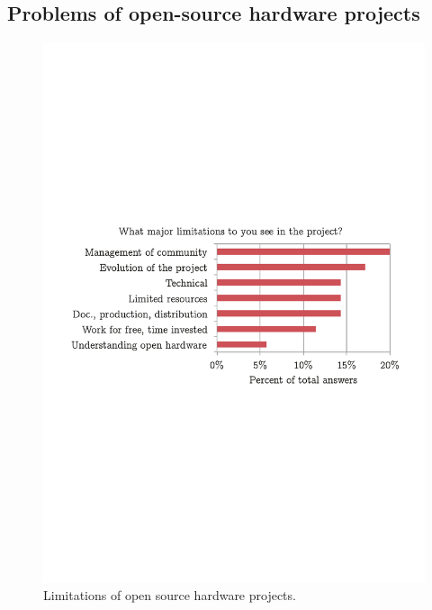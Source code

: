 \documentclass[letterpaper, 10 pt, conference]{ieeeconf}  %
\begin{document}

\subsection{Problems of open-source hardware projects}

\begin{figure}
\centering
\includegraphics[width=\columnwidth]{figures/limitations}
\caption{Limitations of open source hardware projects.}
\label{fig:problems}
\end{figure}
\end{document}
